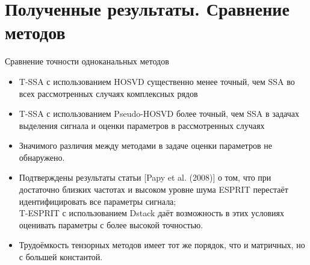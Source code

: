 \documentclass[pdf, unicode, 10pt, notheorems, handout]{beamer}
\newtheorem{theorem}{Теорема}
\begin{document}

\section{Полученные результаты. Сравнение методов}
\begin{frame}{Сравнение точности одноканальных методов}
  \begin{itemize}
    \item T-SSA с использованием HOSVD существенно менее
      точный, чем SSA во всех рассмотренных случаях комплексных рядов\smallskip
    \item T-SSA с использованием Pseudo-HOSVD более
      точный, чем SSA в задачах выделения сигнала и оценки параметров
      в рассмотренных случаях\smallskip
    \item Значимого различия между методами в задаче оценки
      параметров не обнаружено.
    \item Подтверждены результаты статьи [Papy et al. (2008)] о том,
      что при достаточно близких частотах и высоком уровне шума
      ESPRIT перестаёт идентифицировать все параметры сигнала;\\
      T-ESPRIT с использованием Dstack даёт возможность в этих
      условиях оценивать параметры с более высокой точностью.\smallskip
    \item Трудоёмкость тензорных методов имеет тот же порядок, что и
      матричных, но с большей константой.
  \end{itemize}
\end{frame}
\end{document}

